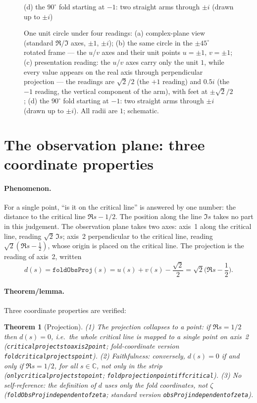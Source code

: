 \documentclass{article}
\renewcommand{\_}{\underscoreOrig\allowbreak}
\newtheorem{theorem}{Theorem}[section]
\newcommand{\C}{\mathbb{C}}
\newcommand{\zt}{\zeta}
\begin{document}
\begin{figure}[ht]
\begin{minipage}[t]{0.48\textwidth}
{\small (d) the $90^\circ$ fold starting at $-1$: two straight arms through $\pm i$ (drawn up to $\pm i$)}
\end{minipage}
\caption{One unit circle under four readings: (a) complex-plane view
(standard $\Re$/$\Im$ axes, $\pm1$, $\pm i$); (b) the same circle in the
$\pm45^\circ$ rotated frame --- the $u$/$v$ axes and their unit points
$u{=}\pm1$, $v{=}\pm1$; (c) presentation reading: the $u$/$v$ axes carry
only the unit $1$, while every value appears on the real axis through
perpendicular projection --- the readings are $\sqrt2/2$ (the $+1$
reading) and $0.5i$ (the $-1$ reading, the vertical component of the
arm), with feet at $\pm\sqrt2/2$; (d) the $90^\circ$ fold starting at
$-1$: two straight arms through $\pm i$ (drawn up to $\pm i$). All radii
are $1$; schematic.}
\label{fig:four_views}
\end{figure}

\section{The observation plane: three coordinate properties}
\label{sec:plane}

\paragraph{Phenomenon.} For a single point, ``is it on the critical
line'' is answered by one number: the distance to the critical line
$\Re s-1/2$. The position along the line $\Im s$ takes no part in this
judgement. The observation plane takes two axes: axis~1 along the
critical line, reading $\sqrt2\,\Im s$; axis~2 perpendicular to the
critical line, reading $\sqrt2(\Re s-\frac12)$, whose origin is placed on
the critical line. The projection is the reading of axis~2, written
\[
  d(s)=\texttt{foldObsProj}(s)=u(s)+v(s)-\frac{\sqrt2}{2}
      =\sqrt2\Big(\Re s-\frac12\Big).
\]

\paragraph{Theorem/lemma.} Three coordinate properties are verified:
\begin{theorem}[Projection]
\label{thm:plane}
(1) The projection collapses to a point: if $\Re s=1/2$ then $d(s)=0$,
i.e.\ the whole critical line is mapped to a single point on axis~2
(\texttt{critical\_projects\_to\_axis2\_point}; fold-coordinate version
\texttt{fold\_critical\_projects\_point}).
(2) Faithfulness: conversely, $d(s)=0$ if and only if $\Re s=1/2$, for
all $s\in\C$, not only in the strip
(\texttt{only\_critical\_projects\_to\_point};
\texttt{fold\_projection\_point\_iff\_critical}).
(3) No self-reference: the definition of $d$ uses only the fold
coordinates, not $\zt$
(\texttt{foldObsProj\_independent\_of\_zeta}; standard version
\texttt{obsProj\_independent\_of\_zeta}).
\end{theorem}
\end{document}
